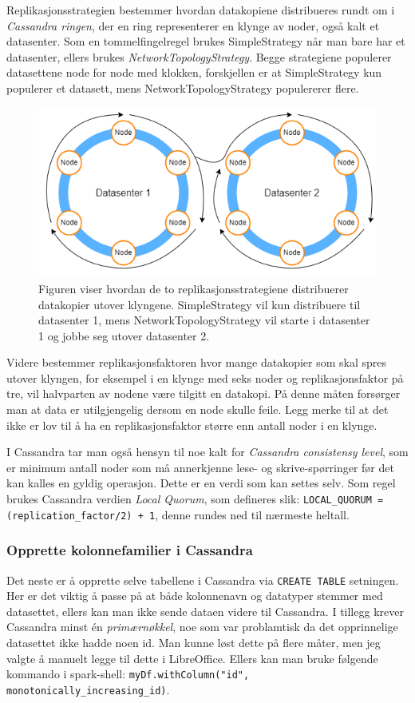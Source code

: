 Replikasjonsstrategien bestemmer hvordan datakopiene distribueres rundt om i \textit{Cassandra ringen}, der en ring representerer en klynge av noder, også kalt et datasenter. Som en tommelfingelregel brukes SimpleStrategy når man bare har et datasenter, ellers brukes \textit{NetworkTopologyStrategy}. Begge strategiene populerer datasettene node for node med klokken, forskjellen er at SimpleStrategy kun populerer et datasett, mens NetworkTopologyStrategy populererer flere.

\FigureCounter
\begin{figure}[H]
  \centering
  \includegraphics[scale=0.5]{images/milepael6/replicationstrategy.drawio.png}
  \caption{Figuren viser hvordan de to replikasjonsstrategiene distribuerer datakopier utover klyngene. SimpleStrategy vil kun distribuere til datasenter 1, mens NetworkTopologyStrategy vil starte i datasenter 1 og jobbe seg utover datasenter 2.}
\end{figure}

Videre bestemmer replikasjonsfaktoren hvor mange datakopier som skal spres utover klyngen, for eksempel i en klynge med seks noder og replikasjonsfaktor på tre, vil halvparten av nodene være tilgitt en datakopi. På denne måten forsørger man at data er utilgjengelig dersom en node skulle feile. Legg merke til at det ikke er lov til å ha en replikasjonsfaktor større enn antall noder i en klynge. 

I Cassandra tar man også hensyn til noe kalt for \textit{Cassandra consistensy level}, som er minimum antall noder som må annerkjenne lese- og skrive-spørringer før det kan kalles en gyldig operasjon. Dette er en verdi som kan settes selv. Som regel brukes Cassandra verdien \textit{Local Quorum}, som defineres slik: \lstinline{LOCAL_QUORUM = (replication_factor/2) + 1}, denne rundes ned til nærmeste heltall.

\subsubsection{Opprette kolonnefamilier i Cassandra}
Det neste er å opprette selve tabellene i Cassandra via \lstinline{CREATE TABLE} setningen. Her er det viktig å passe på at både kolonnenavn og datatyper stemmer med datasettet, ellers kan man ikke sende dataen videre til Cassandra. I tillegg krever Cassandra minst én \textit{primærnøkkel}, noe som var problamtisk da det opprinnelige datasettet ikke hadde noen id. Man kunne løst dette på flere måter, men jeg valgte å manuelt legge til dette i LibreOffice. Ellers kan man bruke følgende kommando i spark-shell: \lstinline{myDf.withColumn("id", monotonically_increasing_id)}.

